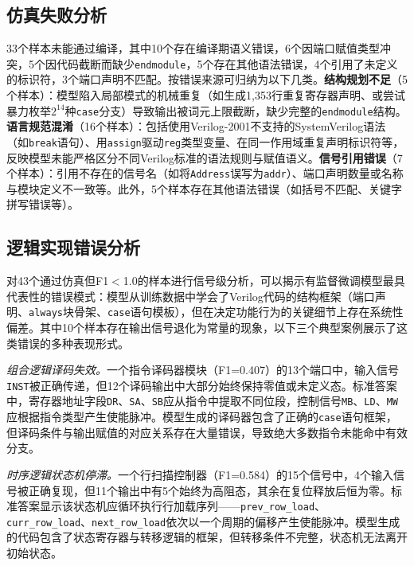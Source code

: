 \subsection{仿真失败分析}

33个样本未能通过编译，其中10个存在编译期语义错误，6个因端口赋值类型冲突，5个因代码截断而缺少\texttt{endmodule}，5个存在其他语法错误，4个引用了未定义的标识符，3个端口声明不匹配。按错误来源可归纳为以下几类。\textbf{结构规划不足}（5个样本）：模型陷入局部模式的机械重复（如生成1{,}353行重复寄存器声明、或尝试暴力枚举$2^{14}$种\texttt{case}分支）导致输出被词元上限截断，缺少完整的\texttt{endmodule}结构。\textbf{语言规范混淆}（16个样本）：包括使用Verilog-2001不支持的SystemVerilog语法（如\texttt{break}语句）、用\texttt{assign}驱动\texttt{reg}类型变量、在同一作用域重复声明标识符等，反映模型未能严格区分不同Verilog标准的语法规则与赋值语义。\textbf{信号引用错误}（7个样本）：引用不存在的信号名（如将\texttt{Address}误写为\texttt{addr}）、端口声明数量或名称与模块定义不一致等。此外，5个样本存在其他语法错误（如括号不匹配、关键字拼写错误等）。

\subsection{逻辑实现错误分析}

对43个通过仿真但F1$<$1.0的样本进行信号级分析，可以揭示有监督微调模型最具代表性的错误模式：模型从训练数据中学会了Verilog代码的结构框架（端口声明、\texttt{always}块骨架、\texttt{case}语句模板），但在决定功能行为的关键细节上存在系统性偏差。其中10个样本存在输出信号退化为常量的现象，以下三个典型案例展示了这类错误的多种表现形式。

\textit{组合逻辑译码失效。}一个指令译码器模块（F1=0.407）的13个端口中，输入信号\texttt{INST}被正确传递，但12个译码输出中大部分始终保持零值或未定义态。标准答案中，寄存器地址字段\texttt{DR}、\texttt{SA}、\texttt{SB}应从指令中提取不同位段，控制信号\texttt{MB}、\texttt{LD}、\texttt{MW}应根据指令类型产生使能脉冲。模型生成的译码器包含了正确的\texttt{case}语句框架，但译码条件与输出赋值的对应关系存在大量错误，导致绝大多数指令未能命中有效分支。

\textit{时序逻辑状态机停滞。}一个行扫描控制器（F1=0.584）的15个信号中，4个输入信号被正确复现，但11个输出中有5个始终为高阻态，其余在复位释放后恒为零。标准答案显示该状态机应循环执行行加载序列——\texttt{prev\_row\_load}、\texttt{curr\_row\_load}、\texttt{next\_row\_load}依次以一个周期的偏移产生使能脉冲。模型生成的代码包含了状态寄存器与转移逻辑的框架，但转移条件不完整，状态机无法离开初始状态。

